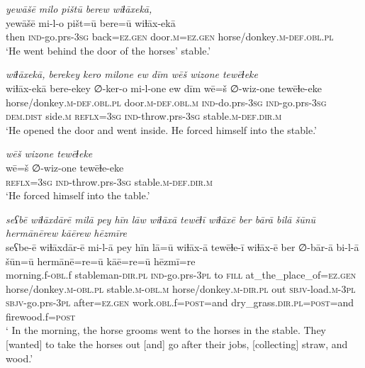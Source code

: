 \ea \label{ŠJ.63}
\textit{yewāšē milo pištū berew wiɫāxekā,} \\ 
\gll yewāšē mi-l-o pišt=ū bere=ū wiɫāx-ekā \\ 
 then \textsc{ind-}go.prs\textsc{-3sg} back\textsc{=ez.gen} door\textsc{.m}\textsc{=ez.gen} horse/donkey\textsc{.m}\textsc{-def}\textsc{.obl}\textsc{.pl} \\ 
\glt `He went behind the door of the horses’ stable.'
\z 
 
\ea \label{ŠJ.64}
\textit{wiɫāxekā, berekey kero milone ew dīm wēš wizone tewēɫeke} \\ 
\gll wiɫāx-ekā bere-ekey ∅-ker-o mi-l-one ew dīm wē=š ∅-wiz-one tewēɫe-eke \\ 
 horse/donkey\textsc{.m}\textsc{-def}\textsc{.obl}\textsc{.pl} door\textsc{.m}\textsc{-def}\textsc{.obl}\textsc{.m} \textsc{ind-}do.prs\textsc{-3sg} \textsc{ind-}go.prs\textsc{-3sg} \textsc{dem.dist} side\textsc{.m} \textsc{reflx}\textsc{=3sg} \textsc{ind-}throw.prs\textsc{-3sg} stable\textsc{.m}\textsc{-def}\textsc{.dir}\textsc{.m} \\ 
\glt `He opened the door and went inside. He forced himself into the stable.'
\z 
 
\ea \label{ŠJ.65}
\textit{wēš wizone tewēɫeke} \\ 
\gll wē=š ∅-wiz-one tewēɫe-eke \\ 
 \textsc{reflx}\textsc{=3sg} \textsc{ind-}throw.prs\textsc{-3sg} stable\textsc{.m}\textsc{-def}\textsc{.dir}\textsc{.m} \\ 
\glt `He forced himself into the table.'
\z 
 
\ea \label{ŠJ.66}
\textit{seʕbē wiɫāxdārē milā pey hīn lāw wiɫāxā tewēɫī wiɫāxē ber bārā bilā šūnū hermānērew kāērew hēzmīre} \\ 
\gll seʕbe-ē wiɫāxdār-ē mi-l-ā pey hīn lā=ū wiɫāx-ā tewēɫe-ī wiɫāx-ē ber ∅-bār-ā bi-l-ā šūn=ū hermānē=re=ū kāē=re=ū hēzmī=re \\ 
 morning.f\textsc{-obl}.f stableman\textsc{-dir}\textsc{.pl} \textsc{ind-}go.prs\textsc{-3pl} to \textsc{fill} at\_the\_place\_of\textsc{=ez.gen} horse/donkey\textsc{.m}\textsc{-obl}\textsc{.pl} stable\textsc{.m}\textsc{-obl}\textsc{.m} horse/donkey\textsc{.m}\textsc{-dir}\textsc{.pl} out \textsc{sbjv-}load\textsc{.m}\textsc{-3pl} \textsc{sbjv-}go.prs\textsc{-3pl} after\textsc{=ez.gen} work\textsc{.obl}.f\textsc{=\textsc{post}}=and dry\_grass\textsc{.dir}\textsc{.pl}\textsc{=\textsc{post}}=and firewood.f\textsc{=\textsc{post}} \\ 
\glt ` In the morning, the horse grooms went to the horses in the stable. They [wanted] to take the horses out [and] go after their jobs, [collecting] straw, and wood.'
\z 
 
